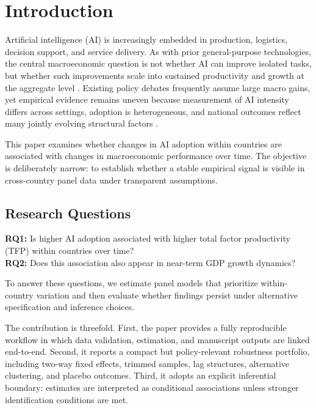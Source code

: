 \section{Introduction}

Artificial intelligence (AI) is increasingly embedded in production, logistics, decision support, and service delivery. As with prior general-purpose technologies, the central macroeconomic question is not whether AI can improve isolated tasks, but whether such improvements scale into sustained productivity and growth at the aggregate level \cite{bresnahanTrajtenberg1995,cominMestieri2018}. Existing policy debates frequently assume large macro gains, yet empirical evidence remains uneven because measurement of AI intensity differs across settings, adoption is heterogeneous, and national outcomes reflect many jointly evolving structural factors \cite{autor2015,brynjolfssonRockSyverson2019,imf2024,goldfarbTucker2019}.

This paper examines whether changes in AI adoption within countries are associated with changes in macroeconomic performance over time. The objective is deliberately narrow: to establish whether a stable empirical signal is visible in cross-country panel data under transparent assumptions.

\subsection{Research Questions}

\textbf{RQ1:} Is higher AI adoption associated with higher total factor productivity (TFP) within countries over time?\\
\textbf{RQ2:} Does this association also appear in near-term GDP growth dynamics?

To answer these questions, we estimate panel models that prioritize within-country variation and then evaluate whether findings persist under alternative specification and inference choices.

The contribution is threefold. First, the paper provides a fully reproducible workflow in which data validation, estimation, and manuscript outputs are linked end-to-end. Second, it reports a compact but policy-relevant robustness portfolio, including two-way fixed effects, trimmed samples, lag structures, alternative clustering, and placebo outcomes. Third, it adopts an explicit inferential boundary: estimates are interpreted as conditional associations unless stronger identification conditions are met.

